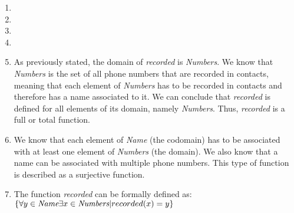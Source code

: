 \begin{enumerate}
    \item
    \item
    \item
    \item
    \item As previously stated, the domain of \emph{recorded} is \emph{Numbers}. We know that \emph{Numbers} is the set 
    of all phone numbers that are recorded in contacts, meaning that each element of \emph{Numbers} has to be recorded in 
    contacts and therefore has a name associated to it. We can conclude that \emph{recorded} is defined for all elements 
    of its domain, namely \emph{Numbers}. Thus, \emph{recorded} is a full or total function.
    \item We know that each element of \emph{Name} (the codomain) has to be associated with at least one element of 
    \emph{Numbers} (the domain). We also know that a name can be associated with multiple phone numbers. This type of 
    function is described as a surjective function. 
    \item The function \emph{recorded} can be formally defined as:\\
    $\{ \forall y \in \emph{Name}  \exists x \in \emph{Numbers} | recorded(x) = y \}$
\end{enumerate}

